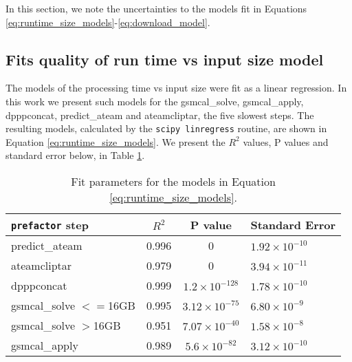 In this section, we note the uncertainties to the models fit in Equations \ref{eq:runtime_size_models}-\ref{eq:download_model}. 

\setcounter{equation}{6}
\renewcommand{\theequation}{\Alph{section}.\arabic{equation}}

\subsection{Fits quality of run time vs input size model}

The models of the processing time vs input size were fit as a linear regression. In this work we present such models for the {\selectfont  gsmcal\_solve}, {\selectfont gsmcal\_apply}, {\selectfont dpppconcat}, {\selectfont predict\_ateam} and {\selectfont ateamcliptar}, the five slowest steps. The resulting models, calculated by the \texttt{scipy linregress}\citep{scipy} routine, are shown in Equation \ref{eq:runtime_size_models}. We present the $R^2$ values, P values and standard error below, in Table \ref{table:fits_size}.



\begin{table}[ht!]
\centering
\begin{tabular}{||p{2.2cm}| c | c|p{2cm}||} 
 \hline
 \texttt{prefactor} step & $R^2$ & P value & Standard Error \\ [0.5ex]
 \hline
 predict\_ateam & 0.996   & 0                    & $1.92\times10^{-10}$    \\ 
 \hline
 ateamcliptar   & 0.979   & 0                    & $3.94\times10^{-11}$    \\ 
 \hline
 dpppconcat     & 0.999   & $1.2\times10^{-128}$ & $1.78\times10^{-10}$    \\ 
 \hline
 gsmcal\_solve $<=$16GB  & 0.995   & $3.12\times10^{-75}$ & $6.80\times10^{-9}$     \\ 
 \hline
 gsmcal\_solve $>$16GB  & 0.951   & $7.07\times10^{-40}$ & $1.58\times10^{-8}$     \\ 
 \hline
 gsmcal\_apply  & 0.989   & $5.6\times10^{-82}$  & $3.12\times10^{-10}$    \\ 

\hline
\end{tabular}
\caption{Fit parameters for the models in Equation \ref{eq:runtime_size_models}. }
\label{table:fits_size}
\end{table}


